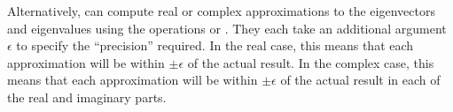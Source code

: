 {{{{{{{{{{{\begin{xtc}
\begin{TeXOutput}
\begin{fricasmath}{5}
%
\end{fricasmath}
\end{TeXOutput}
\end{xtc}

Alternatively, \Language{} can compute real or complex approximations to the
eigenvectors and eigenvalues using the operations 
or .
They each take an additional argument $\epsilon$
to specify the ``precision'' required.
In the real case, this means that each approximation will be within
$\pm\epsilon$ of the actual
result.
In the complex case, this means that each approximation will be within
$\pm\epsilon$ of the actual result
in each of the real and imaginary parts.

}}}}}}}}}}}
